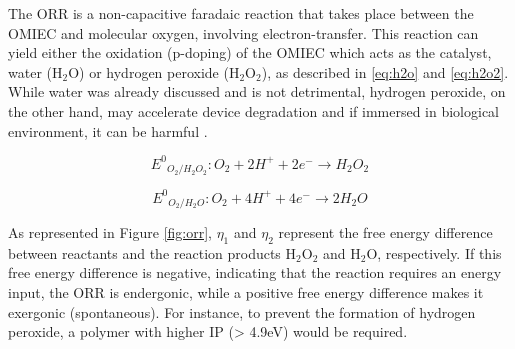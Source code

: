 The ORR is a non-capacitive faradaic reaction that takes place between the OMIEC and molecular oxygen, involving electron-transfer. This reaction can yield either the oxidation (p-doping) of the OMIEC which acts as the catalyst, water (H$_{2}$O) or hydrogen peroxide (H$_{2}$O$_{2}$), as described in \ref{eq:h2o} and \ref{eq:h2o2}. While water was already discussed and is not detrimental, hydrogen peroxide, on the other hand, may accelerate device degradation and if immersed in biological environment, it can be harmful %
\cite{giovannittiEnergeticControlRedoxActive2020}. 



\begin{equation}\label{eq:h2o2}
	{E^{0}}_{O_{2}/H_{2}O_{2}} : O_{2} + 2H^{+} + 2e^{-} \rightarrow H_{2}O_{2}
\end{equation}

\begin{equation}\label{eq:h2o}
	{E^{0}}_{O_{2}/H_{2}O} : O_{2} + 4H^{+} + 4e^{-} \rightarrow 2H_{2}O
\end{equation}

As represented in Figure \ref{fig:orr}, $\eta_{1}$ and $\eta_{2}$ represent the free energy difference between reactants and the reaction products H$_{2}$O$_{2}$ and H$_{2}$O, respectively. If this free energy difference is negative, indicating that the reaction requires an energy input, the ORR is endergonic, while a positive free energy difference makes it exergonic (spontaneous). For instance, to prevent the formation of hydrogen peroxide, a polymer with higher IP (> 4.9eV) would be required. 

